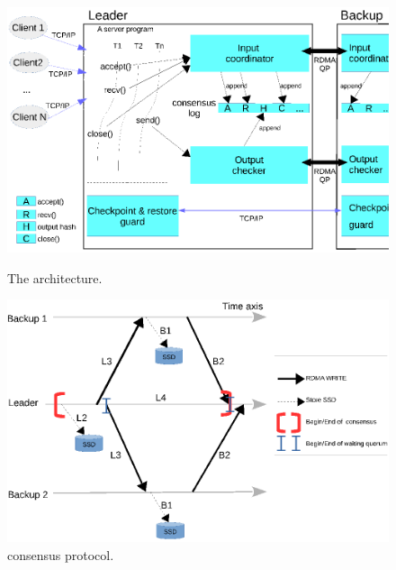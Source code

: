 \begin{figure}[h]
    \begin{minipage}{.4\textwidth}
	\centering
        \vspace{-.15in}
        \includegraphics[width=0.33\textheight]{figures/arch.ps}
        \vspace{-.45in}         
        \caption{The \falcon architecture.}
        \label{fig:falcon-arch}
    \end{minipage}
    \begin{minipage}{0.4\textwidth}
        \vspace{-.15in}
        \centering
        \includegraphics[width=0.33\textheight]{figures/consensus.ps}
        \vspace{-.45in}
        \caption{\falcon consensus protocol.}
        \label{fig:falcon-protocol}
    \end{minipage}
\end{figure}



